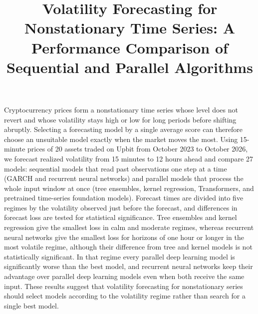 \documentclass[a4paper]{article}
\begin{document}
\title{Volatility Forecasting for Nonstationary Time Series: A Performance Comparison of Sequential and Parallel Algorithms}



\begin{eabstract}
Cryptocurrency prices form a nonstationary time series whose level does not revert and whose volatility stays high or low for long periods before shifting abruptly.
Selecting a forecasting model by a single average score can therefore choose an unsuitable model exactly when the market moves the most.
Using 15-minute prices of 20 assets traded on Upbit from October 2023 to October 2026, we forecast realized volatility from 15 minutes to 12 hours ahead and compare 27 models:
sequential models that read past observations one step at a time (GARCH and recurrent neural networks) and parallel models that process the whole input window at once
(tree ensembles, kernel regression, Transformers, and pretrained time-series foundation models).
Forecast times are divided into five regimes by the volatility observed just before the forecast, and differences in forecast loss are tested for statistical significance.
Tree ensembles and kernel regression give the smallest loss in calm and moderate regimes, whereas recurrent neural networks give the smallest loss for horizons of one hour or longer in the most volatile regime,
although their difference from tree and kernel models is not statistically significant.
In that regime every parallel deep learning model is significantly worse than the best model, and recurrent neural networks keep their advantage over parallel deep learning models even when both receive the same input.
These results suggest that volatility forecasting for nonstationary series should select models according to the volatility regime rather than search for a single best model.
\end{eabstract}

\end{document}
